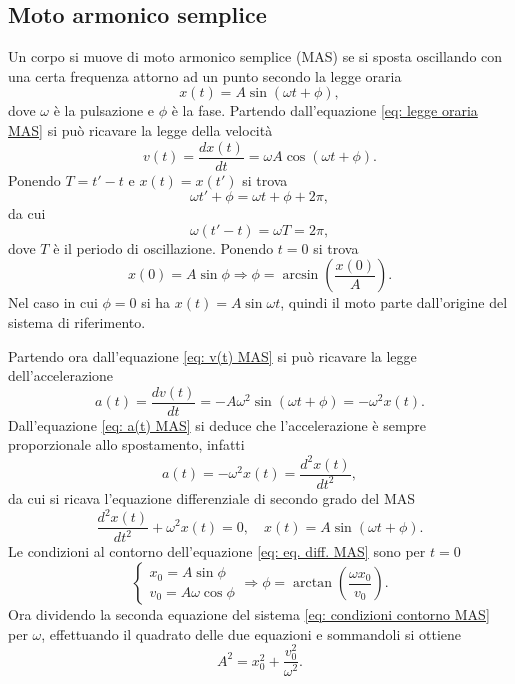 \subsection{Moto armonico semplice}
Un corpo si muove di moto armonico semplice (MAS) se si sposta oscillando con una certa frequenza attorno ad un punto secondo la legge oraria
\begin{equation}
    \label{eq: legge oraria MAS}
    x(t)=A\sin{(\omega t+\phi)},
\end{equation}
dove $\omega$ è la pulsazione e $\phi$ è la fase.
Partendo dall'equazione \eqref{eq: legge oraria MAS} si può ricavare la legge della velocità
\begin{equation}
    \label{eq: v(t) MAS}
    v(t)=\frac{dx(t)}{dt}=\omega A\cos{(\omega t+\phi)}.
\end{equation}
Ponendo $T=t'-t$ e $x(t)=x(t')$ si trova
\begin{equation}
    \omega t'+\phi=\omega t+\phi+2\pi,
\end{equation}
da cui
\begin{equation}
    \omega(t'-t)=\omega T=2\pi,
\end{equation}
dove $T$ è il periodo di oscillazione. Ponendo $t=0$ si trova
\begin{equation}
\label{eq: fase MAS}
    x(0)=A\sin{\phi}\Rightarrow\phi=\arcsin{\left(\frac{x(0)}{A}\right)}.
\end{equation}
Nel caso in cui $\phi=0$ si ha $x(t)=A\sin{\omega t}$, quindi il moto parte dall'origine del sistema di riferimento.

Partendo ora dall'equazione \eqref{eq: v(t) MAS} si può ricavare la legge dell'accelerazione
\begin{equation}
    \label{eq: a(t) MAS}
    a(t)=\frac{dv(t)}{dt}=-A\omega^2\sin{(\omega t+\phi)}=-\omega^2x(t).
\end{equation}
Dall'equazione \eqref{eq: a(t) MAS} si deduce che l'accelerazione è sempre proporzionale allo spostamento, infatti
\begin{equation}
    a(t)=-\omega^2x(t)=\frac{d^2x(t)}{dt^2},
\end{equation}
da cui si ricava l'equazione differenziale di secondo grado del MAS
\begin{equation}
    \label{eq: eq. diff. MAS}
    \frac{d^2x(t)}{dt^2}+\omega^2x(t)=0,\quad x(t)=A\sin{(\omega t+\phi)}.
\end{equation}
Le condizioni al contorno dell'equazione \eqref{eq: eq. diff. MAS} sono per $t=0$
\begin{equation}
    \label{eq: condizioni contorno MAS}
    \begin{cases}
        x_0=A\sin{\phi} \\
        v_0=A\omega\cos{\phi}
    \end{cases}
    \Rightarrow\phi=\arctan{\left(\frac{\omega x_0}{v_0}\right)}.
\end{equation}
Ora dividendo la seconda equazione del sistema \eqref{eq: condizioni contorno MAS} per $\omega$, effettuando il quadrato delle due equazioni e sommandoli si ottiene
\begin{equation}
    A^2=x_0^2+\frac{v_0^2}{\omega^2}.
\end{equation}

